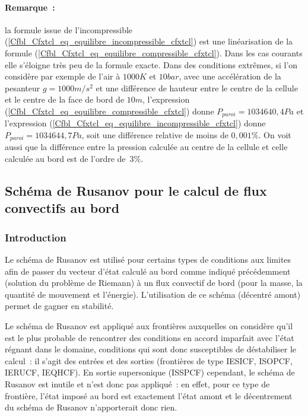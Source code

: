 \paragraph{Remarque~:}
la formule issue de l'incompressible (\ref{Cfbl_Cfxtcl_eq_equilibre_incompressible_cfxtcl})
est une lin\'earisation de la formule (\ref{Cfbl_Cfxtcl_eq_equilibre_compressible_cfxtcl}).
Dans les cas courants elle s'\'eloigne tr\`es peu de la formule exacte.
Dans des conditions extr\^emes,
si l'on consid\`ere par exemple
de l'air \`a $1000K$ et $10bar$, avec une acc\'el\'eration
de la pesanteur $g=1000m/s^2$ et une diff\'erence de hauteur entre
le centre de la cellule et le centre de la face de bord de $10m$,
l'expression (\ref{Cfbl_Cfxtcl_eq_equilibre_compressible_cfxtcl}) donne $P_{paroi} = 1034640,4Pa$
et l'expression (\ref{Cfbl_Cfxtcl_eq_equilibre_incompressible_cfxtcl}) donne $P_{paroi} = 1034644,7Pa$,
soit une diff\'erence relative de moins de $0,001\%$.
On voit aussi que la diff\'erence entre la pression calcul\'ee au centre
de la cellule et celle calcul\'ee au bord est de l'ordre de~$3\%$.

\subsection*{Sch\'ema de Rusanov pour le calcul de flux convectifs au bord}


\subsubsection*{Introduction}

Le sch\'ema de Rusanov est utilis\'e pour certains types de conditions aux
limites afin de passer du vecteur d'\'etat calcul\'e au bord comme indiqu\'e
pr\'ec\'edemment (solution du probl\`eme de Riemann) \`a un flux convectif de
bord (pour la masse, la quantit\'e de
mouvement et l'\'energie). L'utilisation de ce sch\'ema (d\'ecentr\'e amont)
permet de gagner en  stabilit\'e.

Le sch\'ema de Rusanov est appliqu\'e aux fronti\`eres auxquelles on consid\`ere
qu'il est le plus probable de rencontrer des conditions en accord imparfait
avec l'\'etat r\'egnant dans le domaine, conditions qui sont donc susceptibles de
d\'estabiliser le calcul~: il s'agit des entr\'ees et des sorties (fronti\`eres
de type IESICF, ISOPCF, IERUCF, IEQHCF). En sortie
supersonique (ISSPCF) cependant, le sch\'ema de Rusanov est inutile et
n'est donc pas appliqu\'e~:
en effet, pour ce type de fronti\`ere, l'\'etat impos\'e au bord est exactement
l'\'etat amont et le d\'ecentrement du sch\'ema de Rusanov n'apporterait donc
rien.

